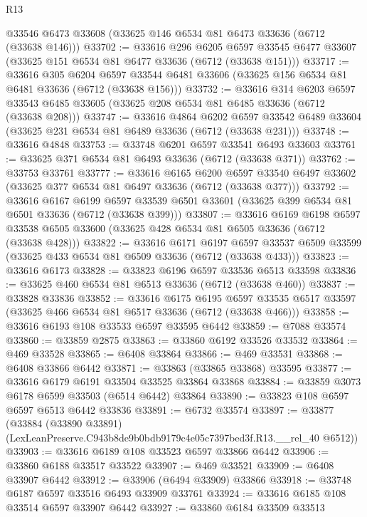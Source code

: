 \begin{lexlean}{R13}
\begin{coremodule}
    @33546
    @6473
    @33608
    (@33625 @146 @6534 @81 @6473 @33636 (@6712 (@33638 @146)))
@33702 := @33616
    @296
    @6205
    @6597
    @33545
    @6477
    @33607
    (@33625 @151 @6534 @81 @6477 @33636 (@6712 (@33638 @151)))
@33717 := @33616
    @305
    @6204
    @6597
    @33544
    @6481
    @33606
    (@33625 @156 @6534 @81 @6481 @33636 (@6712 (@33638 @156)))
@33732 := @33616
    @314
    @6203
    @6597
    @33543
    @6485
    @33605
    (@33625 @208 @6534 @81 @6485 @33636 (@6712 (@33638 @208)))
@33747 := @33616
    @4864
    @6202
    @6597
    @33542
    @6489
    @33604
    (@33625 @231 @6534 @81 @6489 @33636 (@6712 (@33638 @231)))
@33748 := @33616 @4848
@33753 := @33748 @6201 @6597 @33541 @6493 @33603
@33761 := @33625 @371 @6534 @81 @6493 @33636 (@6712 (@33638 @371))
@33762 := @33753 @33761
@33777 := @33616
    @6165
    @6200
    @6597
    @33540
    @6497
    @33602
    (@33625 @377 @6534 @81 @6497 @33636 (@6712 (@33638 @377)))
@33792 := @33616
    @6167
    @6199
    @6597
    @33539
    @6501
    @33601
    (@33625 @399 @6534 @81 @6501 @33636 (@6712 (@33638 @399)))
@33807 := @33616
    @6169
    @6198
    @6597
    @33538
    @6505
    @33600
    (@33625 @428 @6534 @81 @6505 @33636 (@6712 (@33638 @428)))
@33822 := @33616
    @6171
    @6197
    @6597
    @33537
    @6509
    @33599
    (@33625 @433 @6534 @81 @6509 @33636 (@6712 (@33638 @433)))
@33823 := @33616 @6173
@33828 := @33823 @6196 @6597 @33536 @6513 @33598
@33836 := @33625 @460 @6534 @81 @6513 @33636 (@6712 (@33638 @460))
@33837 := @33828 @33836
@33852 := @33616
    @6175
    @6195
    @6597
    @33535
    @6517
    @33597
    (@33625 @466 @6534 @81 @6517 @33636 (@6712 (@33638 @466)))
@33858 := @33616 @6193 @108 @33533 @6597 @33595 @6442
@33859 := @7088 @33574
@33860 := @33859 @2875
@33863 := @33860 @6192 @33526 @33532
@33864 := @469 @33528
@33865 := @6408 @33864
@33866 := @469 @33531
@33868 := @6408 @33866 @6442
@33871 := @33863 (@33865 @33868) @33595
@33877 := @33616 @6179 @6191 @33504 @33525 @33864 @33868
@33884 := @33859 @3073 @6178 @6599 @33503 (@6514 @6442) @33864
@33890 := @33823 @108 @6597 @6597 @6513 @6442 @33836
@33891 := @6732 @33574
@33897 := @33877
    (@33884 (@33890 @33891) (LexLeanPreserve.C943b8de9b0bdb9179c4e05c7397bed3f.R13.__rel_40 @6512))
@33903 := @33616 @6189 @108 @33523 @6597 @33866 @6442
@33906 := @33860 @6188 @33517 @33522
@33907 := @469 @33521
@33909 := @6408 @33907 @6442
@33912 := @33906 (@6494 @33909) @33866
@33918 := @33748 @6187 @6597 @33516 @6493 @33909 @33761
@33924 := @33616 @6185 @108 @33514 @6597 @33907 @6442
@33927 := @33860 @6184 @33509 @33513

\end{coremodule}
\end{lexlean}
